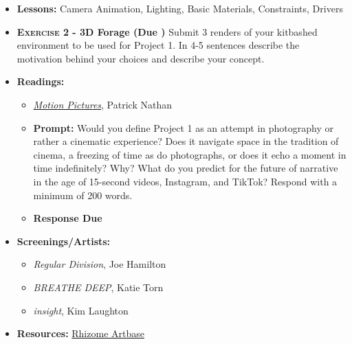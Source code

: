 \begin{itemize}[noitemsep,topsep=0pt,leftmargin=*]
    \item \textbf{Lessons:} Camera Animation, Lighting, Basic Materials, Constraints, Drivers
    \item \textbf{\textsc{Exercise 2} - 3D Forage (Due \dMon)} Submit 3 renders of your kitbashed environment to be used for Project 1. In 4-5 sentences describe the motivation behind your choices and describe your concept. 
    \item \textbf{Readings:}
    \begin{itemize}
        \item \href{https://reallifemag.com/motion-pictures/}{\emph{Motion Pictures}}, Patrick Nathan
        \item \textbf{Prompt:} Would you define Project 1 as an attempt in photography or rather a cinematic experience? Does it navigate space in the tradition of cinema, a freezing of time as do photographs, or does it echo a moment in time indefinitely? Why? What do you predict for the future of narrative in the age of 15-second videos, Instagram, and TikTok? Respond with a minimum of 200 words.
        \item \textbf{Response Due \dThur}
    \end{itemize}
    \item \textbf{Screenings/Artists:}
    \begin{itemize}
        \item \emph{Regular Division}, Joe Hamilton
        \item \emph{BREATHE DEEP}, Katie Torn
        \item \emph{insight}, Kim Laughton
    \end{itemize}
    \item \textbf{Resources:} \href{https://rhizome.org/art/artbase/}{Rhizome Artbase}
\end{itemize}
